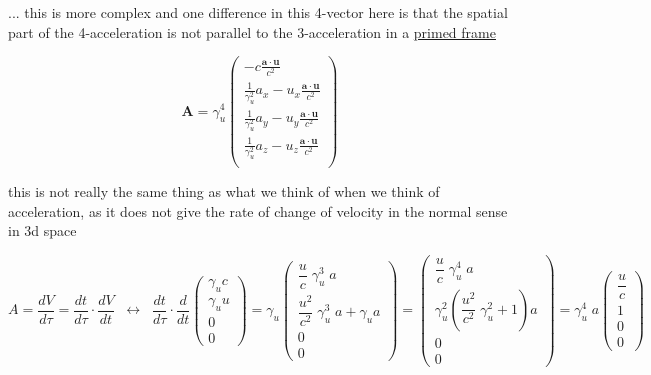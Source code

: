 ... this is more complex and one difference in this 4-vector here is that the spatial part of the 4-acceleration is not parallel to the 3-acceleration in a \hyperlink{def-Primed-Frame}{primed frame}

\begin{equation}
	\mathbf{A} = \gamma_u^4
	\begin{pmatrix}
		-c\frac{\mathbf{a}\cdot\mathbf{u}}{c^2}                              \\
		\frac{1}{\gamma_u^2} a_x - u_x \frac{\mathbf{a}\cdot\mathbf{u}}{c^2} \\
		\frac{1}{\gamma_u^2} a_y - u_y \frac{\mathbf{a}\cdot\mathbf{u}}{c^2} \\
		\frac{1}{\gamma_u^2} a_z - u_z \frac{\mathbf{a}\cdot\mathbf{u}}{c^2} \\
	\end{pmatrix}
\end{equation}

this is not really the same thing as what we think of when we think of acceleration, as it does not give the rate of change of velocity in the normal sense in 3d space

\begin{equation}
	A=\dfrac{dV}{d\tau}=
	\dfrac{dt}{d\tau}\cdot\dfrac{dV}{dt} \;\;\leftrightarrow\;\; \dfrac{dt}{d\tau}\cdot \dfrac{d}{dt}
	\left(\begin{array}{*{20}{c}} \gamma_u c \\ \gamma_u u \\ 0 \\ 0 \end{array}\right)
	= \gamma_u
	\left(\begin{array}{*{20}{c}} \dfrac{u}{c}\;\gamma_u^3\;a \\ \dfrac{u^2}{c^2}\;\gamma_u^3\;a+\gamma_u a \\ 0 \\ 0 \end{array}\right)
	=
	\left(\begin{array}{*{20}{c}} \dfrac{u}{c}\;\gamma_u^4\;a \\ \gamma_u^2\left(\dfrac{u^2}{c^2}\;\gamma_u^2+1\right)a \\ 0 \\ 0 \end{array}\right)
	= \gamma_u^4\;a
	\left(\begin{array}{*{20}{c}} \dfrac{u}{c} \\ 1 \\ 0 \\ 0 \end{array}\right)
\end{equation}

